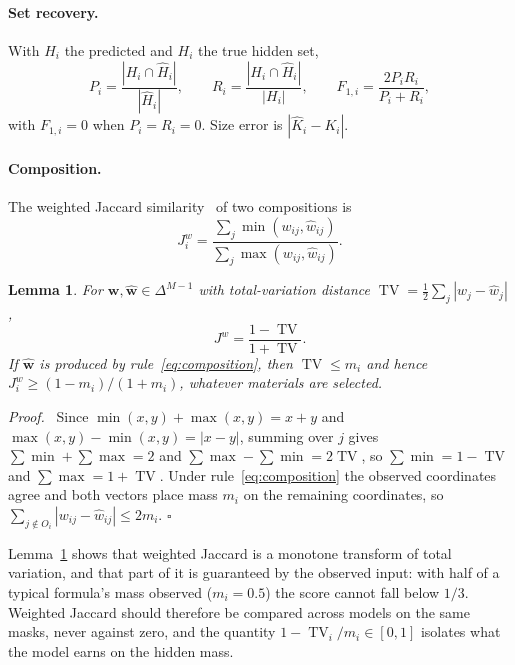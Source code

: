 \documentclass[10pt,a4paper]{article}
\newcommand{\TV}{\operatorname{TV}}
\newtheorem{xlem}{Lemma}
\newenvironment{xproof}{\par\noindent\textit{Proof.}\ }{\hfill$\square$\par\medskip}
\begin{document}
\paragraph{Set recovery.} With $\widehat H_i$ the predicted and $H_i$ the true hidden set,
\begin{equation}
P_i=\frac{|H_i\cap\widehat H_i|}{|\widehat H_i|},\qquad R_i=\frac{|H_i\cap\widehat H_i|}{|H_i|},\qquad F_{1,i}=\frac{2P_iR_i}{P_i+R_i},
\label{eq:f1}
\end{equation}
with $F_{1,i}=0$ when $P_i=R_i=0$. Size error is $|\widehat K_i-K_i|$.

\paragraph{Composition.} The weighted Jaccard similarity~\cite{ioffe2010} of two compositions is
\begin{equation}
J^{w}_i=\frac{\sum_j\min(w_{ij},\widehat w_{ij})}{\sum_j\max(w_{ij},\widehat w_{ij})}.
\label{eq:wj}
\end{equation}

\begin{xlem}
\label{lem:wj}
For $\bm w,\widehat{\bm w}\in\Delta^{M-1}$ with total-variation distance $\TV=\frac12\sum_j|w_j-\widehat w_j|$,
\begin{equation}
J^{w}=\frac{1-\TV}{1+\TV}.
\label{eq:wjtv}
\end{equation}
If $\widehat{\bm w}$ is produced by rule~\eqref{eq:composition}, then $\TV\le m_i$ and hence $J^w_i\ge(1-m_i)/(1+m_i)$, whatever materials are selected.
\end{xlem}
\begin{xproof}
Since $\min(x,y)+\max(x,y)=x+y$ and $\max(x,y)-\min(x,y)=|x-y|$, summing over $j$ gives $\sum\min+\sum\max=2$ and $\sum\max-\sum\min=2\TV$, so $\sum\min=1-\TV$ and $\sum\max=1+\TV$. Under rule~\eqref{eq:composition} the observed coordinates agree and both vectors place mass $m_i$ on the remaining coordinates, so $\sum_{j\notin O_i}|w_{ij}-\widehat w_{ij}|\le2m_i$.
\end{xproof}

Lemma~\ref{lem:wj} shows that weighted Jaccard is a monotone transform of total variation, and that part of it is guaranteed by the observed input: with half of a typical formula's mass observed ($m_i=0.5$) the score cannot fall below $1/3$. Weighted Jaccard should therefore be compared across models on the same masks, never against zero, and the quantity $1-\TV_i/m_i\in[0,1]$ isolates what the model earns on the hidden mass.
\end{document}
